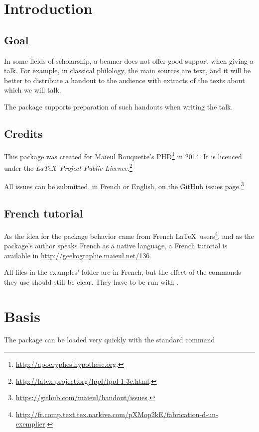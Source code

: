 \documentclass{ltxdockit}[2011/03/25]
\begin{document}
\printtitlepage
\tableofcontents

\section{Introduction}
\subsection{Goal}

In some fields of schol­ar­ship, a beamer does not of­fer good sup­port when giv­ing a talk. For ex­am­ple, in clas­si­cal philol­ogy, the main sources are text, and it will be bet­ter to dis­tribute a hand­out to the au­di­ence with ex­tracts of the texts about which we will talk.

The pack­age sup­ports prepa­ra­tion of such hand­outs when writ­ing the talk.

\subsection{Credits}

This package was created for Maïeul Rouquette's PHD\footnote{\url{http://apocryphes.hypothese.org}.} in 2014. It is licenced under the \emph{\LaTeX\ Project Public Licence}.\footnote{\url{http://latex-project.org/lppl/lppl-1-3c.html}.}

All issues can be submitted, in French or English, on the GitHub issues page.\footnote{\url{https://github.com/maieul/handout/issues}.}

\subsection{French tutorial}

As the idea for the package behavior came from French \LaTeX\ users\footnote{\url{http://fr.comp.text.tex.narkive.com/pXMop2kE/fabrication-d-un-exemplier}.}, and as the package's author speaks French as a native language, a French tutorial is available in \url{http://geekographie.maieul.net/136}.

All files in the examples’ folder are in French, but the effect of the commands they use should still be clear. They  have to be run with \XeLaTeX.

\section{Basis}

The package can be loaded very quickly with the standard command 
\end{document}

